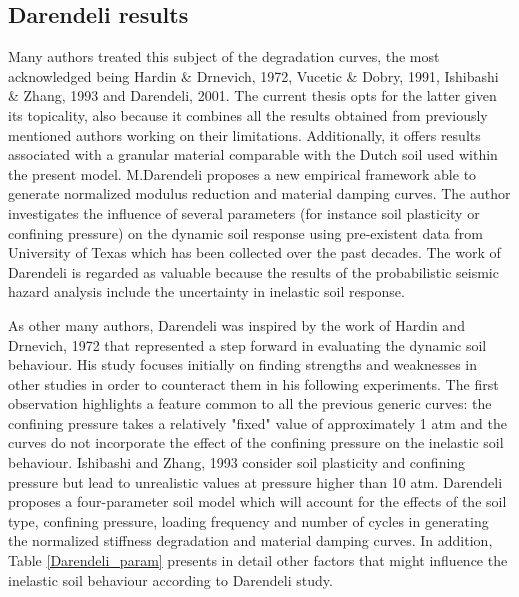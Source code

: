 \documentclass[12pt,a4paper]{report}
\begin{document}
\subsection{Darendeli results}
Many authors treated this subject of the degradation curves, the most acknowledged being Hardin \& Drnevich, 1972, Vucetic \& Dobry, 1991\cite{dobry1988dynamic}, Ishibashi \& Zhang, 1993 \cite{ishibashi1993unified} and Darendeli, 2001\cite{darendeli2001development}. The current thesis opts for the latter given its topicality, also because it combines all the results obtained from previously mentioned authors working on their limitations. Additionally, it offers results associated with a granular material comparable with the Dutch soil used within the present model.
M.Darendeli proposes a new empirical framework able to generate normalized modulus reduction and material damping curves. The author investigates the influence of several parameters (for instance soil plasticity or confining pressure) on the dynamic soil response using pre-existent data from University of Texas which has been collected over the past decades. The work of Darendeli is regarded as valuable because the results of the probabilistic seismic hazard analysis include the uncertainty in inelastic soil response.
 
As other many authors, Darendeli was inspired by the work of Hardin and Drnevich, 1972\cite{hardin1972shear} that represented a step forward in evaluating the dynamic soil behaviour. His study focuses initially on finding strengths and weaknesses in other studies in order to counteract them in his following experiments. The first observation highlights a feature common to all the previous generic curves: the confining pressure takes a relatively "fixed" value of approximately 1 atm and the curves do not incorporate the effect of the confining pressure on the inelastic soil behaviour. Ishibashi and Zhang, 1993 \cite{ishibashi1993unified} consider soil plasticity and confining pressure but lead to unrealistic values at pressure higher than 10 atm. Darendeli proposes a four-parameter soil model which will account for the effects of the soil type, confining pressure, loading frequency and number of cycles in generating the normalized stiffness degradation and material damping curves. In addition, Table \ref{Darendeli_param} presents in detail other factors that might influence the inelastic soil behaviour according to Darendeli study.
\end{document}
